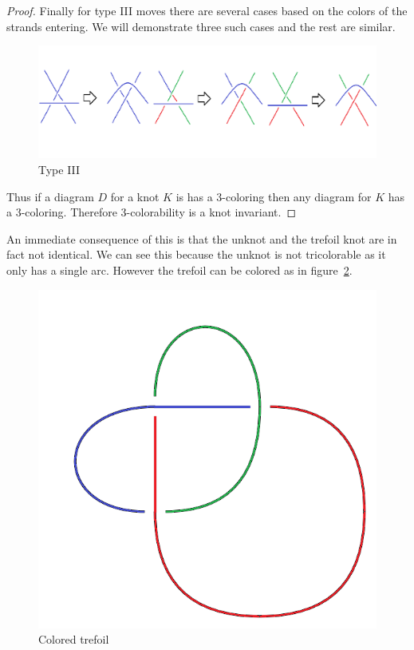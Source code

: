 \documentclass[12pt]{amsart}
\theoremstyle{definition}
\theoremstyle{remark}
\numberwithin{equation}{section}
\newcommand{\ds}{.3}
\begin{document}
\begin{proof}
  Finally for type III moves there are several cases based on
  the colors of the strands entering. We will demonstrate
  three such cases and the rest are similar.
  \begin{figure}
    \includegraphics[scale=\ds]{t3-c}
    \caption{Type III}
    \label{fig:t3-c}
  \end{figure}

  Thus if a diagram $D$ for a knot $K$ is has a 3-coloring then
  any diagram for $K$ has a 3-coloring. Therefore 3-colorability
  is a knot invariant.
\end{proof}

An immediate consequence of this is that the unknot and the trefoil
knot are in fact not identical. We can see this because the unknot
is not tricolorable as it only has a single arc. However the
trefoil can be colored as in figure~\ref{fig:trefoil-c}.

\begin{figure}
  \includegraphics[scale=\ds]{trefoil-c}
  \caption{Colored trefoil}
  \label{fig:trefoil-c}
\end{figure}
\end{document}
